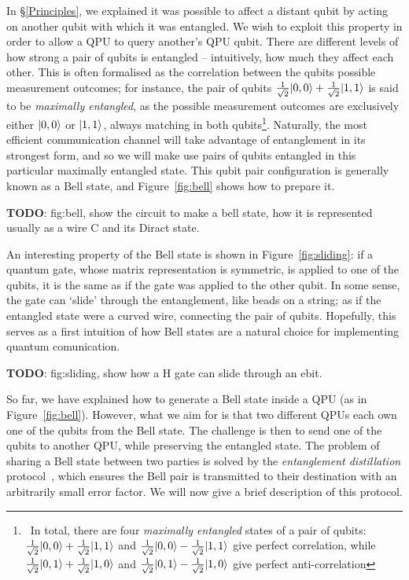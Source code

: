 In \S\ref{Principles}, we explained it was possible to affect a distant qubit by acting on another qubit with which it was entangled. We wish to exploit this property in order to allow a QPU to query another's QPU qubit. There are different levels of how strong a pair of qubits is entangled -- intuitively, how much they affect each other. This is often formalised as the correlation between the qubits possible measurement outcomes; for instance, the pair of qubits \(\frac{1}{\sqrt{2}}\vert 0,0 \rangle + \frac{1}{\sqrt{2}}\vert 1,1 \rangle\) is said to be \textit{maximally entangled}, as the possible measurement outcomes are exclusively either \(\vert 0,0 \rangle\) or \(\vert 1,1 \rangle\), always matching in both qubits\footnote{\, In total, there are four \textit{maximally entangled} states of a pair of qubits: \(\frac{1}{\sqrt{2}}\vert 0,0 \rangle + \frac{1}{\sqrt{2}}\vert 1,1 \rangle\) and \(\frac{1}{\sqrt{2}}\vert 0,0 \rangle - \frac{1}{\sqrt{2}}\vert 1,1 \rangle\) give perfect correlation, while \(\frac{1}{\sqrt{2}}\vert 0,1 \rangle + \frac{1}{\sqrt{2}}\vert 1,0 \rangle\) and \(\frac{1}{\sqrt{2}}\vert 0,1 \rangle - \frac{1}{\sqrt{2}}\vert 1,0 \rangle\) give perfect anti-correlation}. Naturally, the most efficient communication channel will take advantage of entanglement in its strongest form, and so we will make use pairs of qubits entangled in this particular maximally entangled state. This qubit pair configuration is generally known as a Bell state, and Figure~\ref{fig:bell} shows how to prepare it.

\textbf{TODO}: fig:bell, show the circuit to make a bell state, how it is represented usually as a wire C and its Diract state.

An interesting property of the Bell state is shown in Figure~\ref{fig:sliding}: if a quantum gate, whose matrix representation is symmetric, is applied to one of the qubits, it is the same as if the gate was applied to the other qubit. In some sense, the gate can `slide' through the entanglement, like beads on a string; as if the entangled state were a curved wire, connecting the pair of qubits. Hopefully, this serves as a first intuition of how Bell states are a natural choice for implementing quantum comunication.

\textbf{TODO}: fig:sliding, show how a H gate can slide through an ebit.

So far, we have explained how to generate a Bell state inside a QPU (as in Figure~\ref{fig:bell}). However, what we aim for is that two different QPUs each own one of the qubits from the Bell state. The challenge is then to send one of the qubits to another QPU, while preserving the entangled state. The problem of sharing a Bell state between two parties is solved by the \textit{entanglement distillation} protocol~\citep{DistillationProtocol}, which ensures the Bell pair is transmitted to their destination with an arbitrarily small error factor. We will now give a brief description of this protocol.

